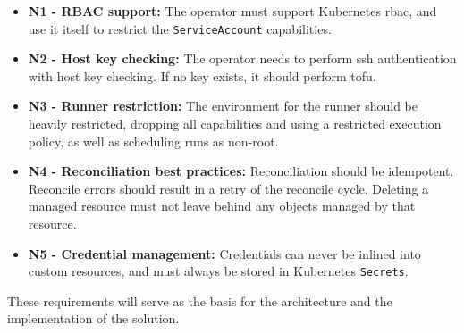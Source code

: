 \begin{itemize}
	\item \textbf{N1 - RBAC support:}
	      The operator must support Kubernetes \gls{rbac}, and use it itself to restrict the \texttt{ServiceAccount} capabilities.
    \item \textbf{N2 - Host key checking:}
          The operator needs to perform \gls{ssh} authentication with host key checking. If no key exists, it should perform \gls{tofu}.
	\item \textbf{N3 - Runner restriction:}
	      The environment for the runner should be heavily restricted, dropping all capabilities and using a restricted execution policy, as well as scheduling runs as non-root.
    \item \textbf{N4 - Reconciliation best practices:}
          Reconciliation should be idempotent. Reconcile errors should result in a retry of the reconcile cycle. Deleting a managed resource must not leave behind any objects managed by that resource.
    \item \textbf{N5 - Credential management:}
          Credentials can never be inlined into custom resources, and must always be stored in Kubernetes \texttt{Secrets}.
\end{itemize}

These requirements will serve as the basis for the architecture and the implementation of the solution.

